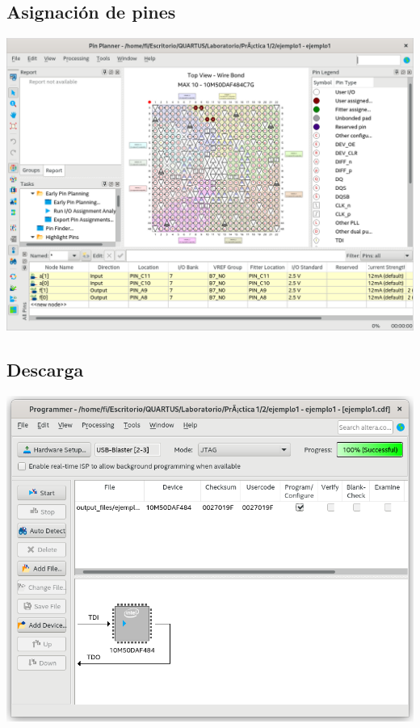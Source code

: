 \documentclass[10pt,a4paper]{article}
\begin{document}
	\subsection{Asignación de pines}
	\begin{center}
		\includegraphics[scale=0.35]{Pines.png}
	\end{center}

	\subsection{Descarga}
	\begin{center}
		\includegraphics[scale=0.35]{Descarga.png}
	\end{center}
	
\end{document}
